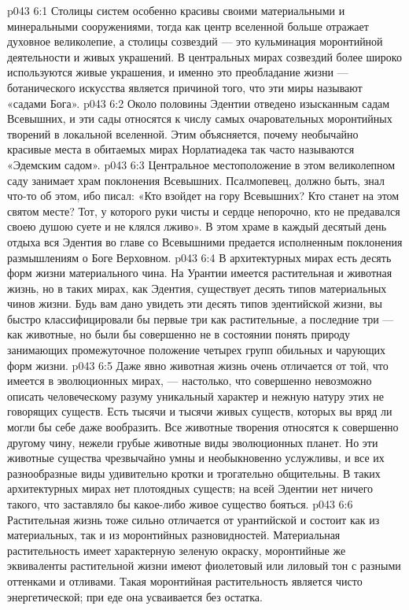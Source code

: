 \vs p043 6:1 Столицы систем особенно красивы своими материальными и минеральными сооружениями, тогда как центр вселенной больше отражает духовное великолепие, а столицы созвездий --- это кульминация моронтийной деятельности и живых украшений. В центральных мирах созвездий более широко используются живые украшения, и именно это преобладание жизни --- ботанического искусства является причиной того, что эти миры называют «садами Бога».
\vs p043 6:2 \pc Около половины Эдентии отведено изысканным садам Всевышних, и эти сады относятся к числу самых очаровательных моронтийных творений в локальной вселенной. Этим объясняется, почему необычайно красивые места в обитаемых мирах Норлатиадека так часто называются «Эдемским садом».
\vs p043 6:3 Центральное местоположение в этом великолепном саду занимает храм поклонения Всевышних. Псалмопевец, должно быть, знал что\hyp{}то об этом, ибо писал: «Кто взойдет на гору Всевышних? Кто станет на этом святом месте? Тот, у которого руки чисты и сердце непорочно, кто не предавался своею душою суете и не клялся лживо». В этом храме в каждый десятый день отдыха вся Эдентия во главе со Всевышними предается исполненным поклонения размышлениям о Боге Верховном.
\vs p043 6:4 \pc В архитектурных мирах есть десять форм жизни материального чина. На Урантии имеется растительная и животная жизнь, но в таких мирах, как Эдентия, существует десять типов материальных чинов жизни. Будь вам дано увидеть эти десять типов эдентийской жизни, вы быстро классифицировали бы первые три как растительные, а последние три --- как животные, но были бы совершенно не в состоянии понять природу занимающих промежуточное положение четырех групп обильных и чарующих форм жизни.
\vs p043 6:5 Даже явно животная жизнь очень отличается от той, что имеется в эволюционных мирах, --- настолько, что совершенно невозможно описать человеческому разуму уникальный характер и нежную натуру этих не говорящих существ. Есть тысячи и тысячи живых существ, которых вы вряд ли могли бы себе даже вообразить. Все животные творения относятся к совершенно другому чину, нежели грубые животные виды эволюционных планет. Но эти животные существа чрезвычайно умны и необыкновенно услужливы, и все их разнообразные виды удивительно кротки и трогательно общительны. В таких архитектурных мирах нет плотоядных существ; на всей Эдентии нет ничего такого, что заставляло бы какое\hyp{}либо живое существо бояться.
\vs p043 6:6 Растительная жизнь тоже сильно отличается от урантийской и состоит как из материальных, так и из моронтийных разновидностей. Материальная растительность имеет характерную зеленую окраску, моронтийные же эквиваленты растительной жизни имеют фиолетовый или лиловый тон с разными оттенками и отливами. Такая моронтийная растительность является чисто энергетической; при еде она усваивается без остатка.
